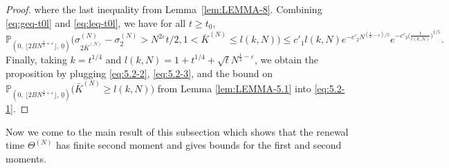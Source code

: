 \documentclass[11pt, reqno]{article}
\numberwithin{equation}{section}
\numberwithin{theorem}{section}
\begin{document}
\begin{proof}
where the last inequality from Lemma~\ref{lem:LEMMA-8}.
Combining \eqref{eq:geq-t0l} and \eqref{eq:leq-t0l}, we have for all $t\geq t_0$,
\begin{equation}\label{eq:5.2-3}
    \mathbb{P}_{(0, \, \lfloor 2BN^{\frac{1}{2}+\varepsilon} \rfloor, \,\underline{0})}\big(\sigma^{(N)}_{2\bar{K}^{(N)}}-\sigma^{(N)}_2>N^{2\varepsilon}t/2,1< \bar{K}^{(N)}\leq l(k,N)\big)\leq c'_1l(k,N)e^{-c'_2N^{(\frac{1}{2}-\varepsilon)/5}}e^{-c'_3\big(\frac{t}{l(k,N)}\big)^{1/5}}.
\end{equation}
Finally, taking $k=t^{1/4}$ and $l(k,N)=1+t^{1/4}+\sqrt{t}N^{\frac{1}{2}-\varepsilon}$, we obtain the proposition by plugging \eqref{eq:5.2-2}, 
\eqref{eq:5.2-3}, and the bound on $\mathbb{P}_{(0, \, \lfloor 2BN^{\frac{1}{2}+\varepsilon} \rfloor, \,\underline{0})}\big(\bar{K}^{(N)}\geq l(k,N)\big)$ from Lemma \ref{lem:LEMMA-5.1} into \eqref{eq:5.2-1}.
\end{proof}

Now we come to the main result of this subsection which shows that the renewal time $\Theta^{(N)}$ has finite second moment and gives bounds for the first and second moments.
\end{document}
